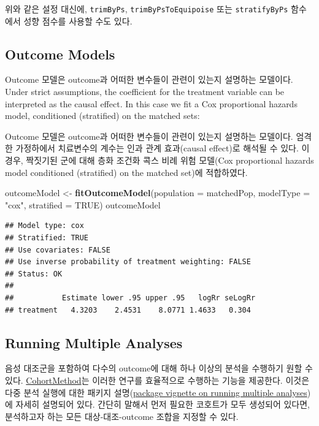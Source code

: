 \documentclass[11pt]{book}
\newenvironment{Shaded}{\begin{snugshade}}{\end{snugshade}}
\newcommand{\KeywordTok}[1]{\textcolor[rgb]{0.13,0.29,0.53}{\textbf{#1}}}
\newcommand{\DataTypeTok}[1]{\textcolor[rgb]{0.13,0.29,0.53}{#1}}
\newcommand{\StringTok}[1]{\textcolor[rgb]{0.31,0.60,0.02}{#1}}
\newcommand{\OtherTok}[1]{\textcolor[rgb]{0.56,0.35,0.01}{#1}}
\newcommand{\NormalTok}[1]{#1}
\theoremstyle{definition}
\theoremstyle{definition}
\theoremstyle{definition}
\theoremstyle{remark}
\begin{document}
위와 같은 설정 대신에, \texttt{trimByPs}, \texttt{trimByPsToEquipoise}
또는 \texttt{stratifyByPs} 함수에서 성향 점수를 사용할 수도 있다.

\subsection{Outcome Models}\label{outcome-models}

Outcome 모델은 outcome과 어떠한 변수들이 관련이 있는지 설명하는
모델이다. Under strict assumptions, the coefficient for the treatment
variable can be interpreted as the causal effect. In this case we fit a
Cox proportional hazards model, conditioned (stratified) on the matched
sets:

Outcome 모델은 outcome과 어떠한 변수들이 관련이 있는지 설명하는
모델이다. 엄격한 가정하에서 치료변수의 계수는 인과 관계 효과(causal
effect)로 해석될 수 있다. 이 경우, 짝짓기된 군에 대해 층화 조건화 콕스
비례 위험 모델(Cox proportional hazards model conditioned (stratified)
on the matched set)에 적합하였다.

\begin{Shaded}
\begin{Highlighting}[]
\NormalTok{outcomeModel <-}\StringTok{ }\KeywordTok{fitOutcomeModel}\NormalTok{(}\DataTypeTok{population =}\NormalTok{ matchedPop,}
                                \DataTypeTok{modelType =} \StringTok{"cox"}\NormalTok{,}
                                \DataTypeTok{stratified =} \OtherTok{TRUE}\NormalTok{)}
\NormalTok{outcomeModel}
\end{Highlighting}
\end{Shaded}

\begin{verbatim}
## Model type: cox
## Stratified: TRUE
## Use covariates: FALSE
## Use inverse probability of treatment weighting: FALSE
## Status: OK
## 
##           Estimate lower .95 upper .95   logRr seLogRr
## treatment   4.3203    2.4531    8.0771 1.4633   0.304
\end{verbatim}

\subsection{Running Multiple Analyses}\label{MultipleAnalyses}

음성 대조군을 포함하여 다수의 outcome에 대해 하나 이상의 분석을 수행하기
원할 수 있다.
\href{https://ohdsi.github.io/CohortMethod/}{CohortMethod}는 이러한
연구를 효율적으로 수행하는 기능을 제공한다. 이것은 다중 분석 실행에 대한
패키지
설명(\href{https://ohdsi.github.io/CohortMethod/articles/MultipleAnalyses.html}{package
vignette on running multiple analyses})에 자세히 설명되어 있다. 간단히
말해서 먼저 필요한 코호트가 모두 생성되어 있다면, 분석하고자 하는 모든
대상-대조-outcome 조합을 지정할 수 있다.
\end{document}
